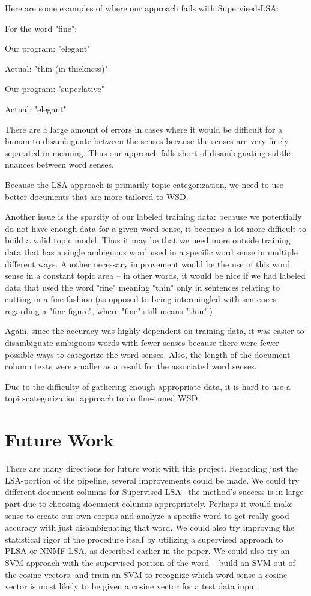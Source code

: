 \documentclass[10pt, letterpaper]{article}
\begin{document}
	Here are some examples of where our approach fails with Supervised-LSA: 

	For the word "fine": 	

	Our program: "elegant"  

	Actual: "thin (in thickness)"

	Our program: "superlative" 

	Actual: "elegant" 	

	There are a large amount of errors in cases where it would be difficult for a human to disambiguate
	between the senses because the senses are very finely separated in meaning. Thus our approach falls short of disambiguating subtle nuances between word senses. 

	Because the LSA approach is primarily topic categorization, we need to use better documents that are more tailored to WSD. 

	Another issue is the sparsity of our labeled training data: because we potentially do not have enough 
	data for a given word sense, it becomes a lot more difficult to build a valid topic model. Thus it may be that we need more outside training data that has a single ambiguous word used in a specific word sense in multiple different ways. Another necessary improvement would be the use of this word sense in a constant topic area -- in other words, it would be nice if we had labeled data that used the word "fine" meaning "thin" only in sentences relating to cutting in a fine fashion (as opposed to being intermingled with sentences regarding a "fine figure", where "fine" still means "thin".) 

	Again, since the accuracy was highly dependent on training data, it was easier to disambiguate
	ambiguous words with fewer senses because there were fewer possible ways to categorize the word senses.
	Also, the length of the document column texts were smaller as a result for the associated word senses. 

	Due to the difficulty of gathering enough appropriate data, it is hard to use a topic-categorization approach to do fine-tuned WSD. 

	\section{Future Work}
	
	There are many directions for future work with this project. 
	Regarding just the LSA-portion of the pipeline, several improvements could be made. We could try different document columns for Supervised LSA-- the method's success is in large part due to choosing document-columns appropriately. Perhaps it would make sense to create our own corpus and analyze a specific word to get really good accuracy with just disambiguating that word. We could also try improving the statistical rigor of the procedure itself by utilizing a supervised approach to PLSA or NNMF-LSA, as described earlier in the paper. We could also try an SVM approach with the supervised portion of the word -- build an SVM out of the cosine vectors, and train an SVM to recognize which word sense a cosine vector is most likely to be given a cosine vector for a test data input.
	
\end{document}
